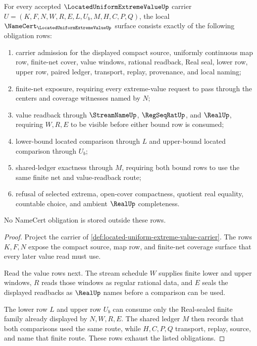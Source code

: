 \begin{theorem}
\label{thm:located-uniform-extreme-value-obligations}
For every accepted $\LocatedUniformExtremeValueUp$ carrier $U=(K,F,N,W,R,E,L,U_b,M,H,C,P,Q)$, the local $\NameCert_{\LocatedUniformExtremeValueUp}$ surface consists exactly of the following obligation rows:
\begin{enumerate}
\item carrier admission for the displayed compact source, uniformly continuous map row, finite-net cover, value windows, rational readback, Real seal, lower row, upper row, paired ledger, transport, replay, provenance, and local naming;
\item finite-net exposure, requiring every extreme-value request to pass through the centers and coverage witnesses named by $N$;
\item value readback through $\StreamNameUp$, $\RegSeqRatUp$, and $\RealUp$, requiring $W,R,E$ to be visible before either bound row is consumed;
\item lower-bound located comparison through $L$ and upper-bound located comparison through $U_b$;
\item shared-ledger exactness through $M$, requiring both bound rows to use the same finite net and value-readback route;
\item refusal of selected extrema, open-cover compactness, quotient real equality, countable choice, and ambient $\RealUp$ completeness.
\end{enumerate}
No NameCert obligation is stored outside these rows.
\end{theorem}
\begin{proof}
Project the carrier of \autoref{def:located-uniform-extreme-value-carrier}. The rows $K,F,N$ expose the compact source, map row, and finite-net coverage surface that every later value read must use.

Read the value rows next. The stream schedule $W$ supplies finite lower and upper windows, $R$ reads those windows as regular rational data, and $E$ seals the displayed readbacks as $\RealUp$ names before a comparison can be used.

The lower row $L$ and upper row $U_b$ can consume only the Real-sealed finite family already displayed by $N,W,R,E$. The shared ledger $M$ then records that both comparisons used the same route, while $H,C,P,Q$ transport, replay, source, and name that finite route. These rows exhaust the listed obligations.
\end{proof}


